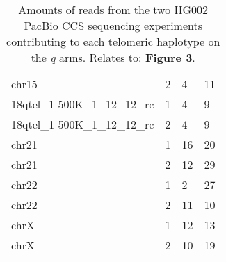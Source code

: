 \begin{samepage}
\begin{table}[h!]
\begin{tabular}{llll}
chr15                          &  2                   &  4                           &  11                          \\
18qtel\_1-500K\_1\_12\_12\_rc  &  1                   &  4                           &  9                           \\
18qtel\_1-500K\_1\_12\_12\_rc  &  2                   &  4                           &  9                           \\
chr21                          &  1                   &  16                          &  20                          \\
chr21                          &  2                   &  12                          &  29                          \\
chr22                          &  1                   &  2                           &  27                          \\
chr22                          &  2                   &  11                          &  10                          \\
chrX                           &  1                   &  12                          &  13                          \\
chrX                           &  2                   &  10                          &  19                          \\
\hline
\end{tabular}
\caption{Amounts of reads from the two HG002 PacBio CCS sequencing experiments contributing to each telomeric haplotype on the \textit{q} arms. Relates to: \textbf{Figure 3}.}
\label{tab:hg002_haplotype_assignment}
\end{table}
\end{samepage}
